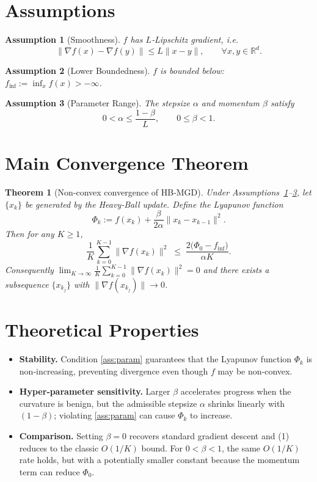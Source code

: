 \documentclass{article}
\newtheorem{theorem}{Theorem}
\newtheorem{assumption}{Assumption}
\newcommand{\grad}{\nabla}
\begin{document}
\newpage
\section*{Assumptions}
\begin{assumption}[Smoothness]\label{ass:smooth}
$f$ has $L$‑Lipschitz gradient, i.e.
\[
\|\grad f(x)-\grad f(y)\|\le L\|x-y\|,\qquad\forall x,y\in\mathbb{R}^{d}.
\]
\end{assumption}
\begin{assumption}[Lower Boundedness]\label{ass:lb}
$f$ is bounded below: $\displaystyle f_{\inf}:=\inf_{x}f(x)>-\infty$.
\end{assumption}
\begin{assumption}[Parameter Range]\label{ass:param}
The stepsize $\alpha$ and momentum $\beta$ satisfy
\[
0<\alpha\le\frac{1-\beta}{L},\qquad 0\le\beta<1 .
\]
\end{assumption}

\section*{Main Convergence Theorem}
\begin{theorem}[Non‑convex convergence of HB‑MGD]\label{thm:main}
Under Assumptions~\ref{ass:smooth}–\ref{ass:param}, let $\{x_{k}\}$ be generated by the Heavy‑Ball update. Define the Lyapunov function
\[
\Phi_{k}:=f(x_{k})+\frac{\beta}{2\alpha}\|x_{k}-x_{k-1}\|^{2}.
\]
Then for any $K\ge1$,
\[
\frac{1}{K}\sum_{k=0}^{K-1}\|\grad f(x_{k})\|^{2}
\;\le\;
\frac{2\bigl(\Phi_{0}-f_{\inf}\bigr)}{\alpha K}.
\tag{1}
\]
Consequently $\displaystyle \lim_{K\to\infty}\frac{1}{K}\sum_{k=0}^{K-1}\|\grad f(x_{k})\|^{2}=0$ and there exists a subsequence $\{x_{k_{j}}\}$ with $\|\grad f(x_{k_{j}})\|\to0$.
\end{theorem}

\section*{Theoretical Properties}
\begin{itemize}
\item \textbf{Stability.} Condition \eqref{ass:param} guarantees that the Lyapunov function $\Phi_{k}$ is non‑increasing, preventing divergence even though $f$ may be non‑convex.
\item \textbf{Hyper‑parameter sensitivity.} Larger $\beta$ accelerates progress when the curvature is benign, but the admissible stepsize $\alpha$ shrinks linearly with $(1-\beta)$; violating \eqref{ass:param} can cause $\Phi_{k}$ to increase.
\item \textbf{Comparison.} Setting $\beta=0$ recovers standard gradient descent and (1) reduces to the classic $O(1/K)$ bound. For $0<\beta<1$, the same $O(1/K)$ rate holds, but with a potentially smaller constant because the momentum term can reduce $\Phi_{0}$.
\end{itemize}
\end{document}
